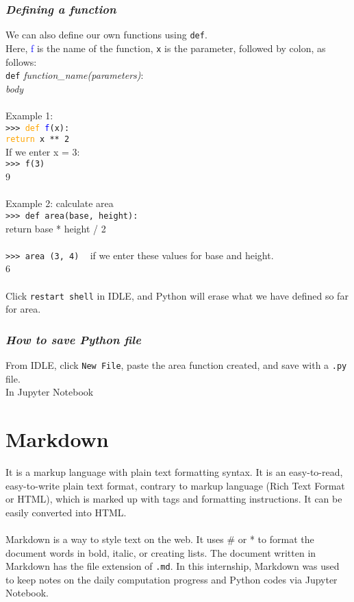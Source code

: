 \documentclass{article}
\begin{document}
{{{\subsubsection{\small\textsl{Defining a function}}
We can also define our own functions using \texttt{def}.\\
Here, \textcolor{blue}{f} is the name of the function, \texttt{x} is the parameter, followed by colon, as follows:\\
\texttt{def} \textit{function\_name(parameters)}: \\
\indent \textit{body}\\
\\
Example 1:\\
\texttt{>>> \textcolor{orange}{def} \textcolor{blue}{f}(x):}\\
\indent \indent \indent \texttt{\textcolor{orange}{return} x ** 2}\\
If we enter x = 3:\\
\texttt{>>> f(3)} \\
9 \\
\\
Example 2: calculate area\\
\texttt{>>> def area(base, height):}\\
\indent \indent \indent return base * height / 2\\
\\
\texttt{>>> area (3, 4)} ~ if we enter these values for base and height.\\
6\\
\\
Click \texttt{restart shell} in IDLE, and Python will erase what we have defined so far for area.\\

\subsubsection{\small\textsl{How to save Python file}}
From IDLE, click \texttt{New File}, paste the area function created, and save with a \texttt{.py} file.\\
In Jupyter Notebook

\newpage
\section{Markdown}
It is a markup language with plain text formatting syntax. It is an easy-to-read, easy-to-write plain text format, contrary to markup language (Rich Text Format or HTML), which is marked up with tags and formatting instructions. It can be easily converted into HTML. \\
\\
Markdown is a way to style text on the web. It uses \# or * to format the document words  in bold, italic, or creating lists. 
The document written in Markdown has the file extension of \texttt{.md}. In this internship, Markdown was used to keep notes on the daily computation progress and Python codes via Jupyter Notebook. 

}}}
\end{document}
